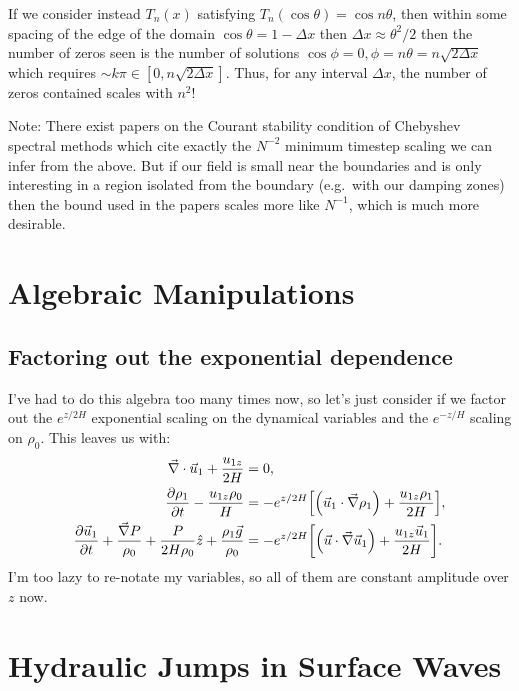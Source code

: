 \documentclass[11pt,
        usenames, %
        dvipsnames %
    ]{report}
\newcommand*{\pd}[2]{\frac{\partial#1}{\partial#2}}
\DeclarePairedDelimiter\p{\lparen}{\rparen}
\DeclarePairedDelimiter\s{\lbrack}{\rbrack}
\begin{document}
If we consider instead $T_n(x)$ satisfying $T_n(\cos \theta) = \cos n\theta$,
then within some spacing of the edge of the domain $\cos\theta = 1 - \Delta x$
then $\Delta x \approx \theta^2/2$ then the number of zeros seen is the number
of solutions $\cos \phi = 0, \phi = n\theta = n\sqrt{2\Delta x}$ which requires
$\sim k\pi \in [0, n\sqrt{2\Delta x}]$. Thus, for any interval $\Delta x$, the
number of zeros contained scales with $n^2$!

Note: There exist papers on the Courant stability condition of Chebyshev
spectral methods which cite exactly the $N^{-2}$ minimum timestep scaling we can
infer from the above. But if our field is small near the boundaries and is only
interesting in a region isolated from the boundary (e.g.\ with our damping
zones) then the bound used in the papers scales more like $N^{-1}$, which is
much more desirable.

\section{Algebraic Manipulations}

\subsection{Factoring out the exponential dependence}

I've had to do this algebra too many times now, so let's just consider if we
factor out the $e^{z/2H}$ exponential scaling on the dynamical variables and the
$e^{-z/H}$ scaling on $\rho_0$. This leaves us with:
\begin{subequations}\label{se:nonlin_factored}
    \begin{align}
        \vec{\nabla} \cdot \vec{u}_1 + \frac{u_{1z}}{2H} &= 0,\\
        \pd{\rho_1}{t} - \frac{u_{1z} \rho_0}{H} &= -e^{z/2H}\s*{
            \p*{\vec{u}_1 \cdot \vec{\nabla} \rho_1} + \frac{u_{1z}\rho_1}{2H}
        },\\
        \pd{\vec{u}_1}{t} + \frac{\vec{\nabla}P}{\rho_0}
            + \frac{P}{2H\rho_0}\hat{z} + \frac{\rho_1\vec{g}}{\rho_0}
            &= -e^{z/2H}\s*{
            \p*{\vec{u} \cdot \vec{\nabla} \vec{u}_1}
                + \frac{u_{1z}\vec{u}_1}{2H}
        }.
    \end{align}
\end{subequations}
I'm too lazy to re-notate my variables, so all of them are constant amplitude
over $z$ now.

\section{Hydraulic Jumps in Surface Waves}
\end{document}
